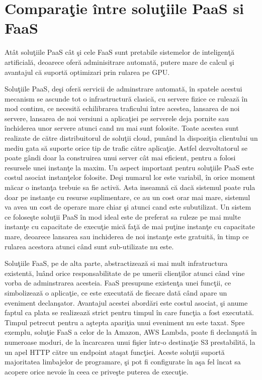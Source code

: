 \documentclass[a4paper,12pt]{report}
\begin{document}
\section{Comparaţie între soluţiile PaaS si FaaS}
\quad Atât soluţiile PaaS cât şi cele FaaS sunt pretabile sistemelor de inteligenţă artificială, deoarece oferă adminisitrare automată, putere mare de calcul şi  avantajul că suportă optimizari prin rularea pe GPU.
\par Soluţiile PaaS, deşi oferă servicii de adminstrare automată, în spatele acestui mecanism se ascunde tot o infrastructură clasică, cu servere fizice ce rulează în mod continu, ce necesită echilibrarea traficului între acestea, lansarea de noi servere, lansarea de noi versiuni a aplicaţiei pe serverele deja pornite sau închiderea unor servere atunci cand nu mai sunt folosite. Toate acestea sunt realizate de către distribuitorul de soluţii cloud, punând la dispoziţia clientului un mediu gata să suporte orice tip de trafic către aplicaţie.  Astfel dezvoltatorul se poate gândi doar la construirea unui server cât mai eficient, pentru a folosi resursele unei instanţe la maxim. Un aspect important pentru soluţiile PaaS este costul asociat instanţelor folosite. Deşi numarul lor este variabil, în orice moment măcar o instanţa trebuie sa fie activă. Asta inseamnă că dacă sistemul poate rula doar pe instanţe cu resurse suplimentare, ce au un cost orar mai mare, sistemul va avea un cost de operare mare chiar şi atunci cand este subutilizat. Un sistem ce foloseşte soluţii PaaS în mod ideal este de preferat sa ruleze pe mai multe instanţe cu capacitate de execuţie mică faţă de mai puţine instanţe cu capacitate mare, deoarece lansarea sau inchiderea de noi instanţe este gratuită, în timp ce rularea acestora atunci când sunt sub-utilizate nu este.
\par Soluţiile FaaS, pe de alta parte, abstractizează si mai mult infratructura existentă, luând orice responsabilitate de pe umerii clienţilor atunci când vine vorba de adminstrarea acesteia. FaaS presupune existenţa unei funcţii, ce simbolizează o aplicaţie, ce este executată de fiecare dată când apare un eveniment declanşator. Avantajul acestei abordări este costul asociat, şi anume faptul ca plata se realizează strict pentru timpul în care funcţia a fost executată. Timpul petrecut pentru a aştepta apariţia unui eveniment nu este taxat. Spre exemplu, soluţie FaaS a celor de la Amazon, AWS Lambda, poate fi declanşată în numeroase moduri, de la încarcarea unui fişier într-o destinaţie S3 prestabilită, la un apel HTTP către un endpoint ataşat funcţiei. Aceste soluţii suportă majoritatea limbajelor de programare, şi pot fi configurate în aşa fel încat sa acopere orice nevoie în ceea ce priveşte puterea de execuţie.
\end{document}
